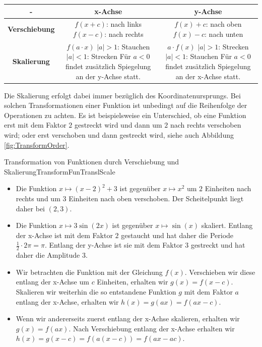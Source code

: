\begin{center}
    \begin{tabular}{ c | c | c }
        - & \textbf{x-Achse} & \textbf{y-Achse} \\
        \hline
        \textbf{Verschiebung} & \makecell{$f(x+c)$: nach links \\ $f(x-c)$: nach rechts} & \makecell{$f(x)+c$: nach oben \\ $f(x)-c$: nach unten} \\
        \hline
        \textbf{Skalierung} & \makecell{$f(a \cdot x)$ \\ $|a| > 1$: Stauchen \\ $|a| < 1$: Strecken \\ Für $a<0$ findet zusätzlich \\ Spiegelung an der y-Achse statt.} & \makecell{$a \cdot f(x)$ \\ $|a| > 1$: Strecken \\ $|a| < 1$: Stauchen \\ Für $a<0$ findet zusätzlich \\ Spiegelung an der x-Achse statt.}
    \end{tabular}
\end{center}

Die Skalierung erfolgt dabei immer bezüglich des Koordinatenursprungs. Bei solchen Transformationen einer Funktion ist unbedingt auf die Reihenfolge der Operationen zu achten. Es ist beispielsweise ein Unterschied, ob eine Funktion erst mit dem Faktor $2$ gestreckt wird und dann um $2$ nach rechts verschoben wird; oder erst verschoben und dann gestreckt wird, siehe auch Abbildung \ref{fig:TransformOrder}.

\begin{example}{Transformation von Funktionen durch Verschiebung und Skalierung}{TransformFunTranslScale}
    \begin{itemize}
        \item Die Funktion $x \mapsto (x-2)^2+3$ ist gegenüber $x \mapsto x^2$ um $2$ Einheiten nach rechts und um $3$ Einheiten nach oben verschoben. Der Scheitelpunkt liegt daher bei $(2,3)$.
        \item Die Funktion $x \mapsto 3\sin(2x)$ ist gegenüber $x \mapsto \sin(x)$ skaliert. Entlang der x-Achse ist mit dem Faktor $2$ gestaucht und hat daher die Periode $\frac{1}{2}\cdot 2\pi = \pi$. Entlang der y-Achse ist sie mit dem Faktor $3$ gestreckt und hat daher die Amplitude $3$.
        \item Wir betrachten die Funktion mit der Gleichung $f(x)$. Verschieben wir diese entlang der x-Achse um $c$ Einheiten, erhalten wir $g(x) = f(x-c)$. Skalieren wir weiterhin die so entstandene Funktion $g$ mit dem Faktor $a$ entlang der x-Achse, erhalten wir $h(x) = g(ax) = f(ax-c)$.
        \item Wenn wir andererseits zuerst entlang der x-Achse skalieren, erhalten wir $g(x) = f(ax)$. Nach Verschiebung entlang der x-Achse erhalten wir $h(x) = g(x-c) = f(a(x-c)) = f(ax-ac)$.
    \end{itemize}
\end{example}

